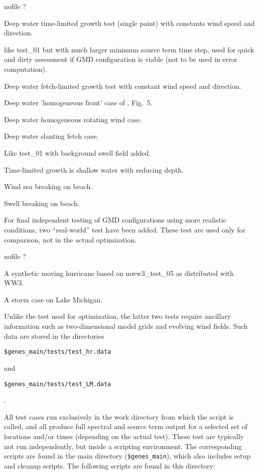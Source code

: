 \documentclass[12pt]{article}
\newcommand{\ws}{WW3}
\newcommand{\file}{\sf}
\newcommand{\code}{\tt}
\newenvironment{flist}{\begin{list}{nofile ?}{\parsep 0mm
            \itemsep 0mm \leftmargin 35mm \labelwidth 25mm
            \rightmargin 10mm}}{\end{list}}
\newcommand{\fit}[2]{\item[{\file{#1}}\hfill]{#2}}
\begin{document}
\begin{flist}
\fit{test\_01}{Deep water time-limited growth test (single point) with
               constants wind speed and direction.}
\fit{test\_0X}{like {\file test\_01} but with much larger minimum source term
               time step, used for quick and dirty assessment if GMD
               configuration is viable (not to be used in error computation).}
\fit{test\_02}{Deep water fetch-limited growth test with constant wind speed
               and direction.}
\fit{test\_03}{Deep water 'homogeneous front' case of \cite{tol:JPO92},
               Fig.~5.} 
\fit{test\_04}{Deep water homogeneous rotating wind case.}
\fit{test\_05}{Deep water slanting fetch case.}
\fit{test\_06}{Like {\file test\_01} with background swell field added.}
\fit{test\_11}{Time-limited growth is shallow water with reducing depth.}
\fit{test\_12}{Wind sea breaking on beach.}
\fit{test\_13}{Swell breaking on beach.}
\end{flist}

\noindent
For final independent testing of GMD configurations using more realistic
conditions, two ``real-world'' test have been added. These test are used only
for comparison, not in the actual optimization.

\begin{flist}
\fit{test\_hr}{A synthetic moving hurricane based on {\file
               mww3\_test\_05} as distributed with \ws.}
\fit{test\_LM}{A storm case on Lake Michigan.}
\end{flist}

\noindent
Unlike the test used for optimization, the latter two tests require ancillary
information such as two-dimensional model grids and evolving wind fields. Such
data are stored in the directories \\
\centerline{\code \$genes\_main/tests/test\_hr.data}
\noindent and \\
\centerline{\code \$genes\_main/tests/test\_LM.data}.

\vspace{\baselineskip}
\noindent
All test cases run exclusively in the work directory from which the script is
called, and all produce full spectral and source term output for a selected
set of locations and/or times (depending on the actual test). These test are
typically not run independently, but inside a scripting environment. The
corresponding scripts are found in the main directory ({\code \$genes\_main}),
which also includes setup and cleanup scripts. The following scripts are found
in this directory:
\end{document}
